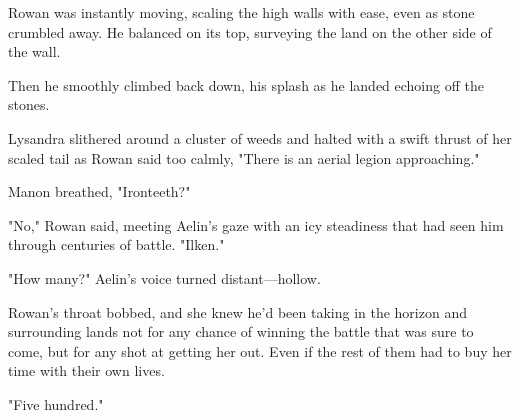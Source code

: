 Rowan was instantly moving, scaling the high walls with ease, even as stone crumbled away. He balanced on its top, surveying the land on the other side of the wall.

Then he smoothly climbed back down, his splash as he landed echoing off the stones.

Lysandra slithered around a cluster of weeds and halted with a swift thrust of her scaled tail as Rowan said too calmly, "There is an aerial legion approaching."

Manon breathed, "Ironteeth?"

"No," Rowan said, meeting Aelin's gaze with an icy steadiness that had seen him through centuries of battle. "Ilken."

"How many?" Aelin's voice turned distant---hollow.

Rowan's throat bobbed, and she knew he'd been taking in the horizon and surrounding lands not for any chance of winning the battle that was sure to come, but for any shot at getting her out. Even if the rest of them had to buy her time with their own lives.

"Five hundred."
